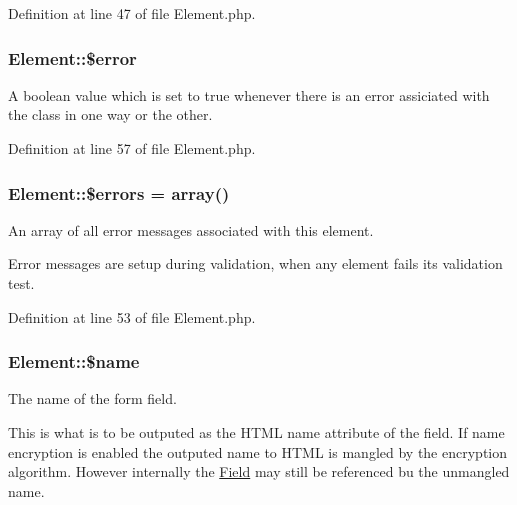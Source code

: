 Definition at line 47 of file Element.php.

\hypertarget{class_element_a32cd1c7684f9ffd01cfba1ebd7171f47}{
\subsubsection[{\$error}]{\setlength{\rightskip}{0pt plus 5cm}Element::\$error}}
\label{class_element_a32cd1c7684f9ffd01cfba1ebd7171f47}


A boolean value which is set to true whenever there is an error assiciated with the class in one way or the other. 



Definition at line 57 of file Element.php.

\hypertarget{class_element_ab75315206e498260e432db06b92d847d}{
\subsubsection[{\$errors}]{\setlength{\rightskip}{0pt plus 5cm}Element::\$errors = array()}}
\label{class_element_ab75315206e498260e432db06b92d847d}


An array of all error messages associated with this element. 

Error messages are setup during validation, when any element fails its validation test. 

Definition at line 53 of file Element.php.

\hypertarget{class_element_a788f6a1a91ffca959c3f9c12dfdcd0fa}{
\subsubsection[{\$name}]{\setlength{\rightskip}{0pt plus 5cm}Element::\$name}}
\label{class_element_a788f6a1a91ffca959c3f9c12dfdcd0fa}


The name of the form field. 

This is what is to be outputed as the HTML name attribute of the field. If name encryption is enabled the outputed name to HTML is mangled by the encryption algorithm. However internally the \hyperlink{class_field}{Field} may still be referenced bu the unmangled name. 


